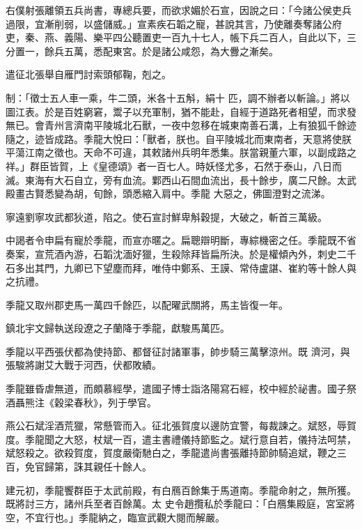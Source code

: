 \begin{pinyinscope}
 右僕射張離領五兵尚書，專總兵要，而欲求媚於石宣，因說之曰：「今諸公侯吏兵過限，宜漸削弱，以盛儲威。」宣素疾石韜之寵，甚說其言，乃使離奏奪諸公府吏，秦、燕、義陽、樂平四公聽置吏一百九十七人，帳下兵二百人，自此以下，三分置一，餘兵五萬，悉配東宮。於是諸公咸怨，為大釁之漸矣。



 遣征北張舉自雁門討索頭郁鞠，剋之。



 制：「徵士五人車一乘，牛二頭，米各十五斛，絹十
 匹，調不辦者以斬論。」將以圖江表。於是百姓窮窘，鬻子以充軍制，猶不能赴，自經于道路死者相望，而求發無已。會青州言濟南平陵城北石獸，一夜中忽移在城東南善石溝，上有狼狐千餘迹隨之，迹皆成路。季龍大悅曰：「獸者，朕也。自平陵城北而東南者，天意將使朕平蕩江南之徵也。天命不可違，其敕諸州兵明年悉集。朕當親董六軍，以副成路之祥。」群臣皆賀，上《皇德頌》者一百七人。時妖怪尤多，石然于泰山，八日而滅。東海有大石自立，旁有血流。鄴西山石間血流出，長十餘步，廣二尺餘。太武殿畫古賢悉變為胡，旬餘，頭悉縮入肩中。季龍
 大惡之，佛圖澄對之流涕。



 寧遠劉寧攻武都狄道，陷之。使石宣討鮮卑斛穀提，大破之，斬首三萬級。



 中謁者令申扁有寵於季龍，而宣亦暱之。扁聰辯明斷，專綜機密之任。季龍既不省奏案，宣荒酒內游，石韜沈湎好獵，生殺除拜皆扁所決。於是權傾內外，刺史二千石多出其門，九卿已下望塵而拜，唯侍中鄭系、王謨、常侍盧諶、崔約等十餘人與之抗禮。



 季龍又取州郡吏馬一萬四千餘匹，以配曜武關將，馬主皆復一年。



 鎮北宇文歸執送段遼之子蘭降于季龍，獻駿馬萬匹。



 季龍以平西張伏都為使持節、都督征討諸軍事，帥步騎三萬擊涼州。既
 濟河，與張駿將謝艾大戰于河西，伏都敗績。



 季龍雖昏虐無道，而頗慕經學，遣國子博士詣洛陽寫石經，校中經於祕書。國子祭酒聶熊注《穀梁春秋》，列于學官。



 燕公石斌淫酒荒獵，常懸管而入。征北張賀度以邊防宜警，每裁諫之。斌怒，辱賀度。季龍聞之大怒，杖斌一百，遣主書禮儀持節監之。斌行意自若，儀持法呵禁，斌怒殺之。欲殺賀度，賀度嚴衛馳白之，季龍遣尚書張離持節帥騎追斌，鞭之三百，免官歸第，誅其親任十餘人。



 建元初，季龍饗群臣于太武前殿，有白鴈百餘集于馬道南。季龍命射之，無所獲。既將討三方，諸州兵至者百餘萬。太
 史令趙攬私於季龍曰：「白鴈集殿庭，宮室將空，不宜行也。」季龍納之，臨宣武觀大閱而解嚴。




\end{pinyinscope}
